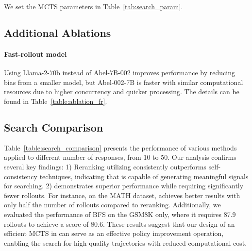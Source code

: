 We set the MCTS parameters in Table~\ref{tab:search_param}.


\subsection{Additional Ablations}
\label{app:add_ablations}
\paragraph{Fast-rollout model} Using Llama-2-70b instead of Abel-7B-002 improves performance by reducing bias from a smaller model, but Abel-002-7B is faster with similar computational resources due to higher concurrency and quicker processing. The details can be found in Table~\ref{table:ablation_fr}.



\subsection{Search Comparison}
\label{app:search_comparison}

Table~\ref{table:search_comparison} presents the performance of various methods applied to different number of responses, from 10 to 50. Our analysis confirms several key findings: 1) Reranking utilizing \orm{} consistently outperforms self-consistency techniques, indicating that \orm{} is capable of generating meaningful signals for searching. 2) \emcts{} demonstrates superior performance while requiring significantly fewer rollouts. For instance, on the MATH dataset, \emcts{} achieves better results with only half the number of rollouts compared to reranking. Additionally, we evaluated the performance of BFS on the GSM8K only, where it requires 87.9 rollouts to achieve a score of 80.6. These results suggest that our design of an efficient MCTS in \model{} can serve as an effective policy improvement operation, enabling the search for high-quality trajectories with reduced computational cost.

